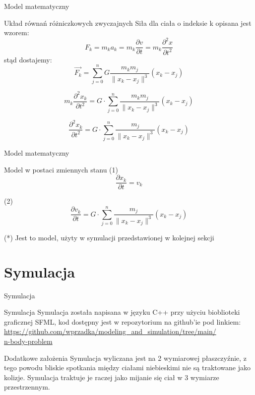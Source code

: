 \documentclass{beamer}
\begin{document}
\begin{frame}{Model matematyczny}
    \begin{block}{Układ równań różniczkowych zwyczajnych}
        Siła dla ciała o indeksie k opisana jest wzorem:
        $$ F_{k} 
        = m_{k} a_{k} 
        = m_{k} \frac{\partial v}{\partial t} 
        = m_{k} \frac{\partial^2 x}{\partial t^2} $$
        stąd dostajemy:
        $$ \vec{F_{k}}
        = \sum_{j = 0}^{n} G \frac{ m_{k} m_{j} }{ \| x_{k} - x_{j} \|^3 }(x_{k} - x_{j})$$
        
        $$ m_{k} \frac{\partial^2 x_{k}}{\partial t^2}
        = G\cdot \sum_{j = 0}^{n} \frac{ m_{k} m_{j} }{ \| x_{k} - x_{j} \|^3 }(x_{k} - x_{j})$$
        
        $$ \frac{\partial^2 x_{k}}{\partial t^2}
        = G\cdot \sum_{j = 0}^{n} \frac{ m_{j} }{ \| x_{k} - x_{j} \|^3 }(x_{k} - x_{j})$$
    \end{block}
\end{frame}

\begin{frame}{Model matematyczny}
    \begin{block}{Model w postaci zmiennych stanu}
        (1) $$ \frac{\partial x_{k}}{\partial t} = v_{k}$$
    
        (2) $$ \frac{\partial v_{k}}{\partial t}
        = G\cdot \sum_{j = 0}^{n} 
        \frac{ m_{j} }{ \| x_{k} - x_{j} \|^3 }
        (x_{k} - x_{j})$$
    \end{block}
    \begin{block}{(*)}
        Jest to model, użyty w symulacji przedstawionej w kolejnej sekcji    
    \end{block}
\end{frame}

\section{Symulacja}

\begin{frame}{Symulacja}
    \begin{block}{Symulacja}
        Symulacja została napisana w języku C++ przy użyciu bioblioteki graficznej SFML, kod dostępny jest w repozytorium na github'ie pod linkiem:\\
        \href{https://github.com/wprzadka/modeling_and_simulation/tree/main/n-body-problem}
        {https://github.com/wprzadka/modeling\_and\_simulation/tree/main/\\n-body-problem}
    \end{block}
    \begin{block}{Dodatkowe założenia}
        Symulacja wyliczana jest na 2 wymiarowej płaszczyźnie, z tego powodu bliskie spotkania między ciałami niebieskimi nie są traktowane jako kolizje. Symulacja traktuje je raczej jako mijanie się ciał w 3 wymiarze przestrzennym.
    \end{block}
\end{frame}
\end{document}
